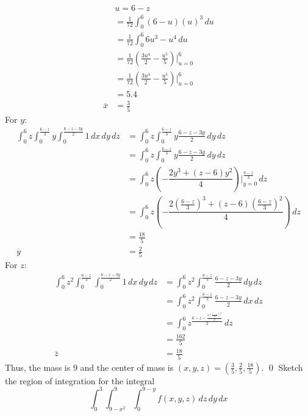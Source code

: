 \documentclass[12pt]{exam}
\begin{document}
\begin{questions}
    \begin{align*}
        &u = 6 - z \\
        &= \frac{1}{72}\int_{0}^{6}(6-u)(u)^3 \, du \\
        &= \frac{1}{72}\int_{0}^{6}6u^3-u^4 \, du \\
        &= \frac{1}{72}\left( \frac{3u^4}{2}-\frac{u^5}{5} \right)|_{u=0}^{6} \\
        &= \frac{1}{72}\left( \frac{3u^4}{2}-\frac{u^5}{5} \right)|_{u=0}^{6} \\
         &= 5.4 \\
         \overline{x} &= \frac{3}{5}
    \end{align*}
    For $y$:
    \begin{align*}
        \int_{0}^{6}z\int_{0}^{\frac{6 - z}{3}} y \int_{0}^{\frac{6 - z - 3y}{2}}  1 \, dx\, dy\, dz &= \int_{0}^{6}z\int_{0}^{\frac{6 - z}{3}} y \frac{6 - z - 3y}{2} \, dy\, dz \\
        &= \int_{0}^{6}z\int_{0}^{\frac{6 - z}{3}} y \frac{6 - z - 3y}{2} \, dy\, dz \\
        &= \int_{0}^{6}z \left( -\dfrac{2y^3+\left(z-6\right)y^2}{4} \right)|_{y = 0}^{\frac{6 - z}{3}} \, dz \\
        &= \int_{0}^{6}z \left( -\dfrac{2\left(\frac{6 - z}{3}\right)^3+\left(z-6\right)\left(\frac{6 - z}{3}\right)^2}{4} \right) \, dz \\
        &= \frac{18}{5} \\
        \overline{y} &= \frac{2}{5}
    \end{align*}
    For $z$: 
    \begin{align*}
        \int_{0}^{6} z^2 \int_{0}^{\frac{6 - z}{3}} \int_{0}^{\frac{6 - z - 3y}{2}} 1 \, dx\, dy\, dz &= \int_{0}^{6} z^2 \int_{0}^{\frac{6 - z}{3}} \frac{6 - z - 3y}{2} \, dy\, dz \\
        &= \int_{0}^{6}z^2 \int_{0}^{\frac{6 - z}{3}} \frac{6 - z - 3y}{2} \, dx\, dz \\
        &= \int_{0}^{6} z^ \frac{6 - z - \frac{3\left(\frac{6 - z}{3}\right)^2}{2}}{2} \, dz \\
        &= \frac{162}{5} \\
        \overline{z} &= \frac{18}{5}
    \end{align*}
    Thus, the mass is $\boxed{9}$ and the center of mass is $(x, y, z) = \boxed{\left(\frac{3}{5}, \frac{2}{5}, \frac{18}{5} \right)}$. \qed
    \clearpage
\question  Sketch the region of integration for the integral
    \[ \int_{0}^{3}\int_{9-x^2}^{9}\int_{0}^{9-y}f(x, y, z) \, dz\, dy\, dx \]

\end{questions}
\end{document}
